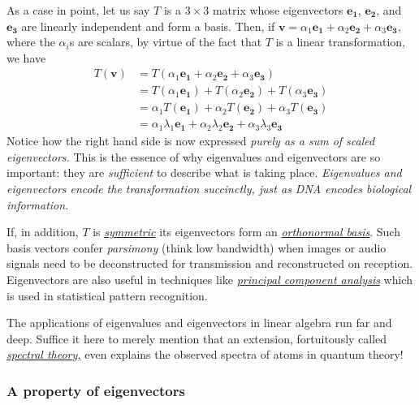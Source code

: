 \documentclass[
  12pt,
  a4paper,
]{article}
\begin{document}
As a case in point, let us say \(T\) is a \(3 \times 3\) matrix whose
eigenvectors \(\boldsymbol{e_{1}}\), \(\boldsymbol{e_{2}}\), and
\(\boldsymbol{e_{3}}\) are linearly independent and form a basis. Then,
if
\(\boldsymbol{v} = \alpha_{1}\boldsymbol{e_{1}} + \alpha_{2}\boldsymbol{e_{2}} + \alpha_{3}\boldsymbol{e_{3}}\),
where the \(\alpha_{i}\)s are scalars, by virtue of the fact that \(T\)
is a linear transformation, we have \[
\begin{aligned}
T(\boldsymbol{v}) & = T(\alpha_{1}\boldsymbol{e_{1}} + \alpha_{2}\boldsymbol{e_{2}} + \alpha_{3}\boldsymbol{e_{3}})\\
& = T(\alpha_{1}\boldsymbol{e_{1}}) + T(\alpha_{2}\boldsymbol{e_{2}}) + T(\alpha_{3}\boldsymbol{e_{3}})\\
& = \alpha_{1}T(\boldsymbol{e_{1}}) + \alpha_{2}T(\boldsymbol{e_{2}}) + \alpha_{3}T(\boldsymbol{e_{3}})\\
& = \alpha_{1}\lambda{_1}\boldsymbol{e_{1}} + \alpha_{2}\lambda_{2}\boldsymbol{e_{2}} + \alpha_{3}\lambda_{3}\boldsymbol{e_{3}}
\end{aligned}
\] Notice how the right hand side is now expressed \emph{purely as a sum
of scaled eigenvectors.} This is the essence of why eigenvalues and
eigenvectors are so important: they are \emph{sufficient} to describe
what is taking place. \emph{Eigenvalues and eigenvectors encode the
transformation succinctly, just as DNA encodes biological information.}

If, in addition, \(T\) is
\href{https://en.wikipedia.org/wiki/Symmetry_in_mathematics}{\emph{symmetric}}
its eigenvectors form an
\href{https://en.wikipedia.org/wiki/Orthonormality}{\emph{orthonormal
basis}}. Such basis vectors confer \emph{parsimony} (think low
bandwidth) when images or audio signals need to be deconstructed for
transmission and reconstructed on reception. Eigenvectors are also
useful in techniques like
\href{https://en.wikipedia.org/wiki/Principal_component_analysis}{\emph{principal
component analysis}} which is used in statistical pattern recognition.

The applications of eigenvalues and eigenvectors in linear algebra run
far and deep. Suffice it here to merely mention that an extension,
fortuitously called
\href{https://en.wikipedia.org/wiki/Spectral_theory}{\emph{spectral
theory,}} even explains the observed spectra of atoms in quantum theory!

\hypertarget{a-property-of-eigenvectors}{%
\subsubsection{A property of
eigenvectors}\label{a-property-of-eigenvectors}}
\end{document}
